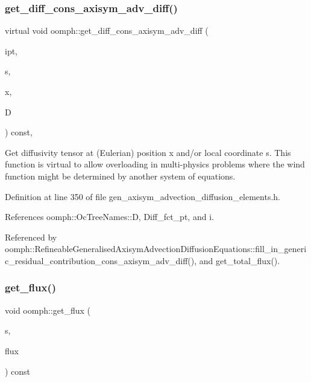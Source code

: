 \subsubsection{\texorpdfstring{get\+\_\+diff\+\_\+cons\+\_\+axisym\+\_\+adv\+\_\+diff()}{get\_diff\_cons\_axisym\_adv\_diff()}}
{\footnotesize\ttfamily virtual void oomph\+::get\+\_\+diff\+\_\+cons\+\_\+axisym\+\_\+adv\+\_\+diff (\begin{DoxyParamCaption}\item[{const unsigned \&}]{ipt,  }\item[{const \hyperlink{classoomph_1_1Vector}{Vector}$<$ double $>$ \&}]{s,  }\item[{const \hyperlink{classoomph_1_1Vector}{Vector}$<$ double $>$ \&}]{x,  }\item[{\hyperlink{classoomph_1_1DenseMatrix}{Dense\+Matrix}$<$ double $>$ \&}]{D }\end{DoxyParamCaption}) const\hspace{0.3cm}{\ttfamily [inline]}, {\ttfamily [virtual]}}



Get diffusivity tensor at (Eulerian) position x and/or local coordinate s. This function is virtual to allow overloading in multi-\/physics problems where the wind function might be determined by another system of equations. 



Definition at line 350 of file gen\+\_\+axisym\+\_\+advection\+\_\+diffusion\+\_\+elements.\+h.



References oomph\+::\+Oc\+Tree\+Names\+::D, Diff\+\_\+fct\+\_\+pt, and i.



Referenced by oomph\+::\+Refineable\+Generalised\+Axisym\+Advection\+Diffusion\+Equations\+::fill\+\_\+in\+\_\+generic\+\_\+residual\+\_\+contribution\+\_\+cons\+\_\+axisym\+\_\+adv\+\_\+diff(), and get\+\_\+total\+\_\+flux().

\mbox{\label{namespaceoomph_af24fd3b21fc45dcbe4b87f8e4224bd15}} 
\subsubsection{\texorpdfstring{get\+\_\+flux()}{get\_flux()}}
{\footnotesize\ttfamily void oomph\+::get\+\_\+flux (\begin{DoxyParamCaption}\item[{const \hyperlink{classoomph_1_1Vector}{Vector}$<$ double $>$ \&}]{s,  }\item[{\hyperlink{classoomph_1_1Vector}{Vector}$<$ double $>$ \&}]{flux }\end{DoxyParamCaption}) const}




